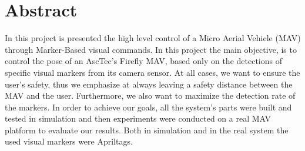 \chapter*{Abstract}


In this project is presented the high level control of a Micro Aerial Vehicle (MAV) through Marker-Based visual commands. In this project the main objective, is to control the pose of an AscTec’s Firefly MAV, based only on the detections of specific visual markers from its camera sensor. At all cases, we want to ensure the user's safety, thus we emphasize at always leaving a safety distance between the MAV and the user. Furthermore, we also want to maximize the detection rate of the markers. In order to achieve our goals, all the system's parts were built and tested in simulation and then experiments were conducted on a real MAV platform to evaluate our results. Both in simulation and in the real system the used visual markers were Apriltags\cite{olson2011tags}. 